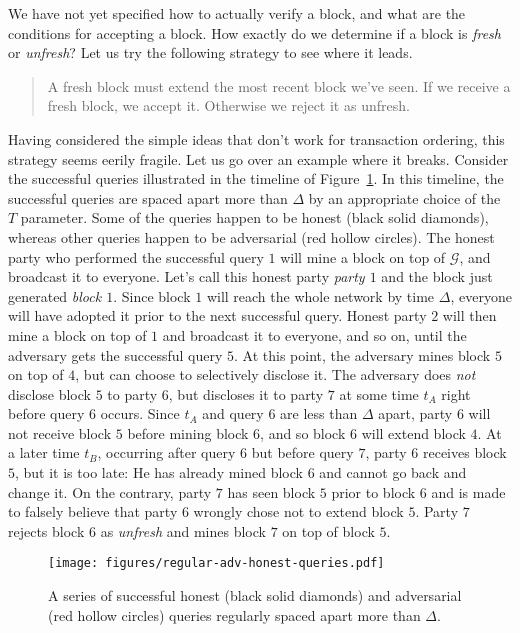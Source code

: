We have not yet specified how to actually verify a block, and what are the conditions for
accepting a block. How exactly do we determine if a block is \emph{fresh} or \emph{unfresh}? Let
us try the following strategy to see where it leads.

\begin{quote}
A fresh block must extend the most recent block we've seen. If we receive a fresh block, we accept
it. Otherwise we reject it as unfresh.
\end{quote}

Having considered the simple ideas that don't work for transaction ordering, this strategy
seems eerily fragile. Let us go over an example where it breaks. Consider the
successful queries illustrated in the timeline of
Figure~\ref{fig.regular-adv-honest-queries}. In this timeline, the successful queries are spaced
apart more than $\Delta$ by an appropriate choice of the $T$ parameter. Some of the queries happen
to be honest (black solid diamonds), whereas other queries happen to be adversarial (red hollow circles).
The honest party who performed the successful query $1$ will mine a block on top of $\mathcal{G}$,
and broadcast it to everyone. Let's call this honest party \emph{party $1$} and the block just generated
\emph{block $1$}. Since block $1$ will reach the whole network by time $\Delta$,
everyone will have adopted it prior to the next successful query. Honest party $2$ will then
mine a block on top of $1$ and broadcast it to everyone, and so on, until the adversary gets
the successful query $5$. At this point, the adversary mines block $5$ on top of $4$, but can choose
to selectively disclose it. The adversary does \emph{not} disclose block $5$ to party $6$,
but discloses it to party $7$ at some time $t_A$ right before query $6$ occurs. Since $t_A$ and
query $6$ are less than $\Delta$ apart, party $6$ will not receive block $5$ before mining block $6$,
and so block $6$ will extend block $4$. At a later time $t_B$, occurring after query $6$ but before query $7$,
party $6$ receives block $5$, but
it is too late: He has already mined block $6$ and cannot go back and change it.
On the contrary, party $7$ has seen block $5$ prior to block $6$ and is made to falsely believe
that party $6$ wrongly chose not to extend block $5$. Party $7$ rejects block $6$ as \emph{unfresh}
and mines block $7$ on top of block $5$.

\begin{figure}[h]
    \centering
    \texttt{[image: figures/regular-adv-honest-queries.pdf]}
    \caption{A series of successful honest (black solid diamonds) and adversarial (red hollow circles) queries
             regularly spaced apart more than $\Delta$.}
    \label{fig.regular-adv-honest-queries}
\end{figure}


